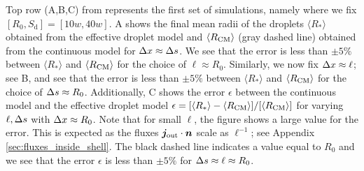 \begin{appendices}
Top row (A,B,C) from  represents the first set of simulations, namely where we fix $[R_0, S_\mathrm{d}] = [10w, 40w]$.
A shows the final mean radii of the droplets $\langle R_\ast \rangle$ obtained from the effective droplet model and $\langle R_\mathrm{CM}\rangle$ (gray dashed line) obtained from the continuous model for $\Delta x \approx \Delta s$.
We see that the error is less than $\pm 5\%$  between $\langle R_\ast \rangle$ and $\langle R_\mathrm{CM}\rangle$ for the choice of $\ell \approx R_0$.
Similarly, we now fix $\Delta x \approx \ell$; see B, and see that the error is less than $\pm 5\%$  between $\langle R_\ast \rangle$ and $\langle R_\mathrm{CM}\rangle$ for the choice of $\Delta s \approx R_0$.
Additionally, C shows the error $\epsilon$ between the continuous model and the effective droplet model $\epsilon = [\langle R_\ast \rangle - \langle R_\mathrm{CM}\rangle] / [\langle R_\mathrm{CM}\rangle]$ for varying $\ell, \Delta s$ with $\Delta x \approx R_0$.
Note that for small $\ell$, the figure shows a large value for the error.
This is expected as the fluxes $\boldsymbol{j}_\mathrm{out} \cdot \boldsymbol{n}$ scale as $\ell^{-1}$; see Appendix \ref{sec:fluxes_inside_shell}.
The black dashed line indicates a value equal to $R_0$ and we see that the error $\epsilon$ is less than $\pm5\%$ for $\Delta s \approx \ell \approx R_0$.


\end{appendices}
